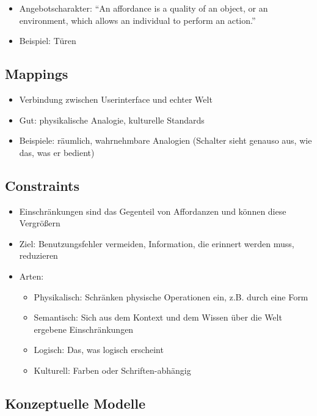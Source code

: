 \begin{itemize}
\item
  Angebotscharakter: ``An affordance is a quality of an object, or an
  environment, which allows an individual to perform an action.''
\item
  Beispiel: Türen
\end{itemize}

\subsection{Mappings}

\begin{itemize}
\item
  Verbindung zwischen Userinterface und echter Welt
\item
  Gut: physikalische Analogie, kulturelle Standards
\item
  Beispiele: räumlich, wahrnehmbare Analogien (Schalter sieht genauso
  aus, wie das, was er bedient)
\end{itemize}

\subsection{Constraints}

\begin{itemize}
\item
  Einschränkungen sind das Gegenteil von Affordanzen und können diese
  Vergrößern
\item
  Ziel: Benutzungsfehler vermeiden, Information, die erinnert werden
  muss, reduzieren
\item
  Arten:

  \begin{itemize}
  \item
    Physikalisch: Schränken physische Operationen ein, z.B. durch eine
    Form
  \item
    Semantisch: Sich aus dem Kontext und dem Wissen über die Welt
    ergebene Einschränkungen
  \item
    Logisch: Das, was logisch erscheint
  \item
    Kulturell: Farben oder Schriften-abhängig
  \end{itemize}
\end{itemize}

\subsection{Konzeptuelle Modelle}

